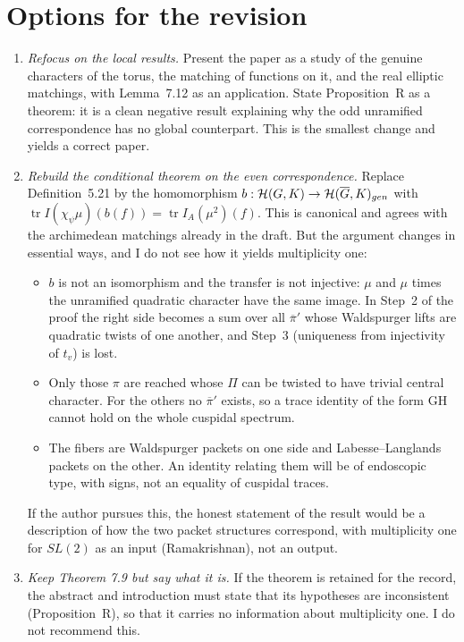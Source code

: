 \documentclass[12pt,letterpaper]{article}
\newcommand{\tr}{\operatorname{tr}}
\newcommand{\ov}[1]{\overline{#1}}
\theoremstyle{plain}
\begin{document}
\section{Options for the revision}\label{sec:options}

\begin{enumerate}
\item[(A)] \emph{Refocus on the local results.} Present the paper as a
study of the genuine characters of the torus, the matching of functions on
it, and the real elliptic matchings, with Lemma~7.12 as an application.
State Proposition~R as a theorem: it is a clean negative result explaining
why the odd unramified correspondence has no global counterpart. This is
the smallest change and yields a correct paper.

\item[(B)] \emph{Rebuild the conditional theorem on the even
correspondence.} Replace Definition~5.21 by the homomorphism
$b:{\cal H}(G,K)\to{\cal H}(\ov G,K)_{gen}$ with
$\tr I(\chi_\psi\mu)(b(f))=\tr I_A(\mu^2)(f)$. This is canonical and
agrees with the archimedean matchings already in the draft. But the
argument changes in essential ways, and I do not see how it yields
multiplicity one:
\begin{itemize}
\item $b$ is not an isomorphism and the transfer is not injective: $\mu$
and $\mu$ times the unramified quadratic character have the same image. In
Step~2 of the proof the right side becomes a sum over all $\ov\pi'$ whose
Waldspurger lifts are quadratic twists of one another, and Step~3
(uniqueness from injectivity of $t_v$) is lost.
\item Only those $\pi$ are reached whose $\Pi$ can be twisted to have
trivial central character. For the others no $\ov\pi'$ exists, so a trace
identity of the form GH cannot hold on the whole cuspidal spectrum.
\item The fibers are Waldspurger packets on one side and
Labesse--Langlands packets on the other. An identity relating them will
be of endoscopic type, with signs, not an equality of cuspidal traces.
\end{itemize}
If the author pursues this, the honest statement of the result would be a
description of how the two packet structures correspond, with multiplicity
one for $SL(2)$ as an input (Ramakrishnan), not an output.

\item[(C)] \emph{Keep Theorem 7.9 but say what it is.} If the theorem is
retained for the record, the abstract and introduction must state that its
hypotheses are inconsistent (Proposition~R), so that it carries no
information about multiplicity one. I do not recommend this.
\end{enumerate}
\end{document}
